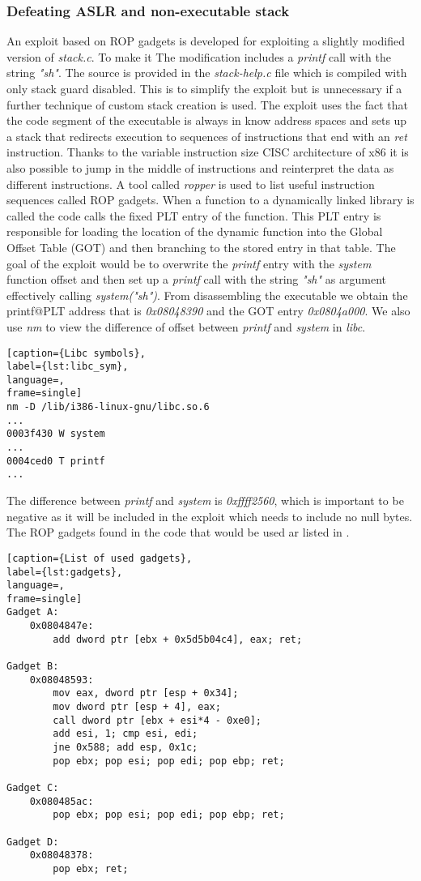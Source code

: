 \subsubsection { Defeating ASLR and non-executable stack }
An exploit based on ROP gadgets\cite{rops} is developed for exploiting a slightly modified version of \emph{stack.c}. To make it The modification includes a \emph{printf} call with the string \emph{"sh"}. The source is provided in the \emph{stack-help.c} file which is compiled with only stack guard disabled. This is to simplify the exploit but is unnecessary if a further technique of custom stack creation is used. The exploit uses the fact that the code segment of the executable is always in know address spaces and sets up a stack that redirects execution to sequences of instructions that end with an \emph{ret} instruction. Thanks to the variable instruction size CISC architecture of x86 it is also possible to jump in the middle of instructions and reinterpret the data as different instructions. A tool called \emph{ropper}\cite{ropper} is used to list useful instruction sequences called ROP gadgets. When a function to a dynamically linked library is called the code calls the fixed PLT entry of the function. This PLT entry is responsible for loading the location of the dynamic function into the Global Offset Table (GOT) and then branching to the stored entry in that table. The goal of the exploit would be to overwrite the \emph{printf} entry with the \emph{system} function offset and then set up a \emph{printf} call with the string \emph{"sh"} as argument effectively calling \emph{system("sh")}. From disassembling the executable we obtain the printf@PLT address that is \emph{0x08048390} and the GOT entry \emph{0x0804a000}. We also use \emph{nm} to view the difference of offset between \emph{printf} and \emph{system} in \emph{libc}.
\begin{lstlisting}[caption={Libc symbols},
label={lst:libc_sym},
language=,
frame=single]
nm -D /lib/i386-linux-gnu/libc.so.6 
...
0003f430 W system
...
0004ced0 T printf
...
\end{lstlisting}
The difference between \emph{printf} and \emph{system} is \emph{0xffff2560}, which is important to be negative as it will be included in the exploit which needs to include no null bytes. The ROP gadgets found in the code that would be used ar listed in . 
\begin{lstlisting}[caption={List of used gadgets},
label={lst:gadgets},
language=,
frame=single]
Gadget A:  
	0x0804847e: 
		add dword ptr [ebx + 0x5d5b04c4], eax; ret;

Gadget B:  
	0x08048593: 
		mov eax, dword ptr [esp + 0x34]; 
		mov dword ptr [esp + 4], eax; 
		call dword ptr [ebx + esi*4 - 0xe0]; 
		add esi, 1; cmp esi, edi; 
		jne 0x588; add esp, 0x1c; 
		pop ebx; pop esi; pop edi; pop ebp; ret; 

Gadget C:  
	0x080485ac: 
		pop ebx; pop esi; pop edi; pop ebp; ret; 

Gadget D:
	0x08048378: 
		pop ebx; ret; 
\end{lstlisting}
